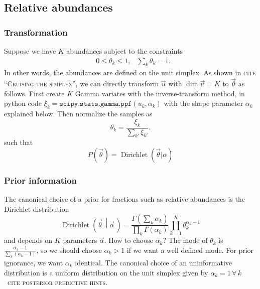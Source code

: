 \documentclass[a4,12pt]{article}
\DeclareMathOperator{\Dirichlet}{Dirichlet}
\newcommand{\given}[2]{\left(#1\, \middle| #2 \, \right)}
\newcommand{\vecalpha}{\ensuremath{\vec{\alpha}}}
\newcommand{\vecth}{\ensuremath{{\vec{\theta}}}}
\newcommand{\vecu}{\ensuremath{{\vec{u}}}}
\newcommand{\todo}[1]{{\textsc{\color{red}#1}}}
\begin{document}
\subsection{Relative abundances}

\subsubsection{Transformation}

Suppose we have $K$ abundances subject to the constraints
\begin{align}
  \label{eq:unit-simplex}
  & 0 \leq \theta_k \leq 1, & \sum_{k}\theta_k = 1.
\end{align}
In other words, the abundances are defined on the unit simplex.  As
shown in \todo{cite ``Cruising the simplex''}, we can directly
transform $\vecu$ with $\dim \vecu = K$ to $\vecth$ as follows. First
create $K$ Gamma variates with the inverse-transform method, in python
code $\xi_k = \texttt{scipy.stats.gamma.ppf}(u_k, \alpha_k)$ with the
shape parameter $\alpha_k$ explained below. Then normalize the samples
as
\begin{equation}
  \label{eq:dirichlet-gamma}
  \theta_k = \frac{\xi_k}{\sum_{k'} \xi_{k'}}.
\end{equation}
such that
\begin{equation}
  \label{eq:dirichlet-prior}
  P(\vecth) = \Dirichlet(\vecth | \alpha)
\end{equation}

\subsubsection{Prior information}

The canonical choice of a prior for fractions such as relative
abundances is the Dirichlet
distribution~\cite[App.~B]{bishop_pattern_2006}
\begin{equation}
  \label{eq:dirichlet-def}
  \Dirichlet \given{\vecth}{\vecalpha} = \frac{\Gamma\left(\sum_k \alpha_k\right)}{\prod_k \Gamma(\alpha_k)} \prod_{k=1}^K \theta_k^{\alpha_k-1}
\end{equation}
and depends on $K$ parameters $\vecalpha$. How to choose $\alpha_k$?
The mode of $\theta_k$ is $\frac{\alpha_k - 1}{\sum_k (\alpha_k -
  1)}$, so we should choose $\alpha_k > 1$ if we want a well defined
mode. For prior ignorance, we want $\alpha_k$ identical. The canonical
choice of an uninformative distribution is a uniform distribution on
the unit simplex given by $\alpha_k=1 \, \forall \, k$~\todo{cite
  posterior predictive hints}.
\end{document}
